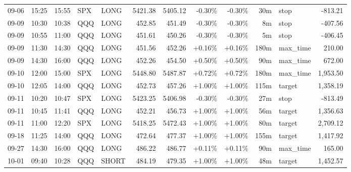 \documentclass[11pt,a4paper,twoside]{article}
\begin{document}
\begin{center}
\begin{longtable}{>{\color{txtmain}}l l l l l r r r r r >{\color{txtmain}}l r}
09-06 & 15:25 & 15:55 & SPX & LONG & 5421.38 & 5405.12 & \textcolor{lossred}{-0.30\%} & \textcolor{lossred}{-0.30\%} & 30m & stop & \textcolor{lossred}{-813.21} \\
09-09 & 10:30 & 10:38 & QQQ & LONG & 452.85 & 451.49 & \textcolor{lossred}{-0.30\%} & \textcolor{lossred}{-0.30\%} & 8m & stop & \textcolor{lossred}{-407.56} \\
09-09 & 10:55 & 11:00 & QQQ & LONG & 451.61 & 450.26 & \textcolor{lossred}{-0.30\%} & \textcolor{lossred}{-0.30\%} & 5m & stop & \textcolor{lossred}{-406.45} \\
09-09 & 11:30 & 14:30 & QQQ & LONG & 451.56 & 452.26 & \textcolor{wingreen}{+0.16\%} & \textcolor{wingreen}{+0.16\%} & 180m & max\_time & \textcolor{wingreen}{210.00} \\
09-09 & 14:30 & 16:00 & QQQ & LONG & 452.26 & 454.50 & \textcolor{wingreen}{+0.50\%} & \textcolor{wingreen}{+0.50\%} & 90m & max\_time & \textcolor{wingreen}{672.00} \\
09-10 & 12:00 & 15:00 & SPX & LONG & 5448.80 & 5487.87 & \textcolor{wingreen}{+0.72\%} & \textcolor{wingreen}{+0.72\%} & 180m & max\_time & \textcolor{wingreen}{1,953.50} \\
09-10 & 12:05 & 14:00 & QQQ & LONG & 452.73 & 457.26 & \textcolor{wingreen}{+1.00\%} & \textcolor{wingreen}{+1.00\%} & 115m & target & \textcolor{wingreen}{1,358.19} \\
09-11 & 10:20 & 10:47 & SPX & LONG & 5423.25 & 5406.98 & \textcolor{lossred}{-0.30\%} & \textcolor{lossred}{-0.30\%} & 27m & stop & \textcolor{lossred}{-813.49} \\
09-11 & 10:45 & 11:41 & QQQ & LONG & 452.21 & 456.73 & \textcolor{wingreen}{+1.00\%} & \textcolor{wingreen}{+1.00\%} & 56m & target & \textcolor{wingreen}{1,356.63} \\
09-11 & 11:00 & 12:20 & SPX & LONG & 5418.25 & 5472.43 & \textcolor{wingreen}{+1.00\%} & \textcolor{wingreen}{+1.00\%} & 80m & target & \textcolor{wingreen}{2,709.12} \\
09-18 & 11:25 & 14:00 & QQQ & LONG & 472.64 & 477.37 & \textcolor{wingreen}{+1.00\%} & \textcolor{wingreen}{+1.00\%} & 155m & target & \textcolor{wingreen}{1,417.92} \\
09-27 & 14:30 & 16:00 & QQQ & LONG & 486.22 & 486.77 & \textcolor{wingreen}{+0.11\%} & \textcolor{wingreen}{+0.11\%} & 90m & max\_time & \textcolor{wingreen}{165.00} \\
10-01 & 09:40 & 10:28 & QQQ & SHORT & 484.19 & 479.35 & \textcolor{wingreen}{+1.00\%} & \textcolor{wingreen}{+1.00\%} & 48m & target & \textcolor{wingreen}{1,452.57} \\

\end{longtable}
\end{center}
\end{document}
